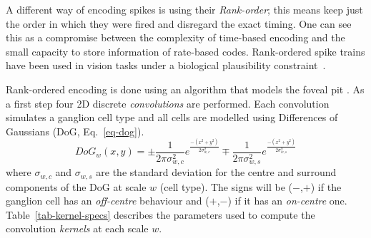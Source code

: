 A different way of encoding spikes is using their \emph{Rank-order}; this means
keep just the order in which they were fired and disregard the exact timing. One
can see this as a compromise between the complexity of time-based encoding and 
the small capacity to store information of rate-based codes. Rank-ordered spike 
trains have been used in vision tasks under a biological plausibility 
constraint~\cite{van-rullen-rate-coding,basab-model}.

Rank-ordered encoding is done using an algorithm that models the foveal pit 
\cite{basab-model}. As a first step four 2D discrete \emph{convolutions} are 
performed. Each convolution simulates a ganglion cell type and all cells are modelled using Differences of Gaussians (DoG, Eq.~\ref{eq-dog}). \begin{equation}
\label{eq-dog}
DoG_w(x,y) = \pm\frac{1}{2\pi\sigma_{w,c}^2}e^{\frac{-(x^2 + y^2)}{2\sigma_{w,c}^2}}
\mp\frac{1}{2\pi\sigma_{w,s}^2}e^{\frac{-(x^2 + y^2)}{2\sigma_{w,s}^2}}
\end{equation}
where $\sigma_{w,c}$ and $\sigma_{w,s}$ are the standard deviation for the 
centre and surround components of the DoG at scale $w$ (cell type). The signs 
will be ($-$,$+$) if the ganglion cell has an \emph{off-centre} behaviour and 
($+$,$-$) if it has an \emph{on-centre} one. Table~\ref{tab-kernel-specs} 
describes the parameters used to compute the convolution \emph{kernels} at each 
scale $w$.

